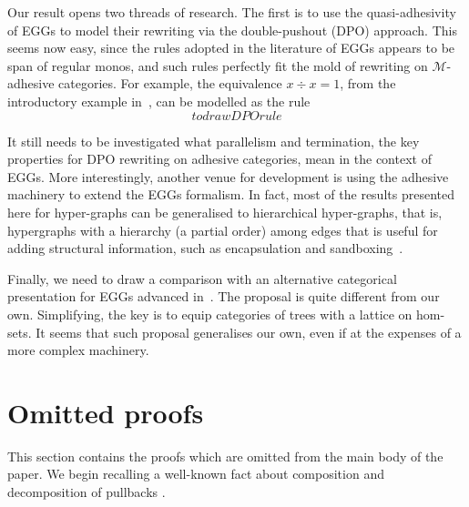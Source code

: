 \documentclass[a4paper,UKenglish,cleveref,pdftex,thm-restate,numberwithinsect]{lipics-v2021}
\begin{document}
Our result opens two threads of research. The first is to use the quasi-adhesivity of EGGs to
model their rewriting via the double-pushout (DPO) approach. This seems now easy, since 
the rules adopted in the literature of EGGs appears to be span of regular monos, and such rules
perfectly fit the mold of rewriting on $\mathcal{M}$-adhesive categories. 
For example, the equivalence $x \div x = 1$, from the introductory example in~\cite{xxx}, 
can be modelled as the rule
\[to draw DPO rule\]

It still needs to be investigated what parallelism and termination, the key properties for DPO rewriting
on adhesive categories, 
mean in the context of EGGs. More interestingly, another venue for development is using the adhesive 
machinery to extend the EGGs formalism. In fact, most of the results
presented here for hyper-graphs can be generalised to hierarchical hyper-graphs, that is, 
hypergraphs with a hierarchy (a partial order) among 
edges that is useful for adding structural information, such as encapsulation and sandboxing~\cite{xxx}.

Finally, we need to draw a comparison with an alternative categorical presentation for EGGs 
advanced in~\cite{ghica}. The proposal is quite different from our own. Simplifying, the key is to equip categories 
of trees with a lattice on hom-sets. 
It seems that such proposal generalises our own, 
even if at the expenses of a more complex machinery.



\appendix

\section{Omitted proofs}

This section contains the proofs which are omitted from the main body of the paper. 
%
We begin recalling  a well-known fact about composition and decomposition of pullbacks \cite{mac2013categories}.
\end{document}
